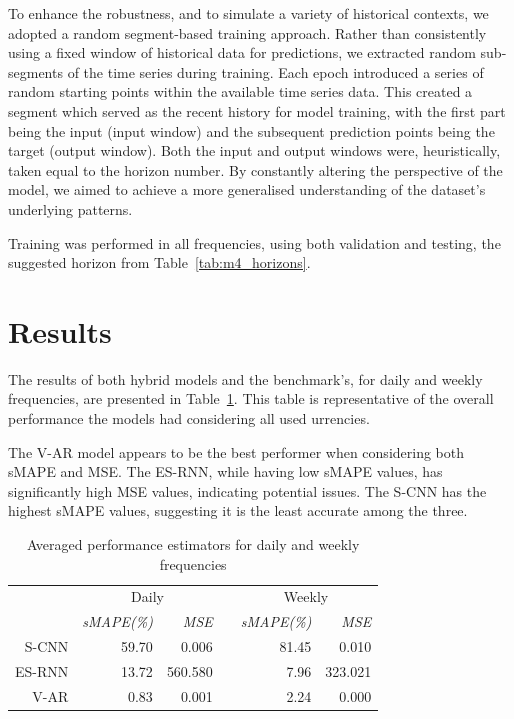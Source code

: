\documentclass[conference]{IEEEtran}
\begin{document}
To enhance the robustness, and to simulate a variety of historical contexts, we adopted a random segment-based training approach. Rather than consistently using a fixed window of historical data for predictions, we extracted random sub-segments of the time series during training. Each epoch introduced a series of random starting points within the available time series data. This created a segment which served as the recent history for model training, with the first part being the input (input window) and the subsequent prediction points being the target (output window). Both the input and output windows were, heuristically, taken equal to the horizon number. By constantly altering the perspective of the model, we aimed to achieve a more generalised understanding of the dataset's underlying patterns.

Training was performed in all frequencies, using both validation and testing, the suggested horizon from Table~\ref{tab:m4_horizons}.

\section{Results}

The results of both hybrid models and the benchmark's, for daily and weekly frequencies, are presented in Table~\ref{tab:res}. This table is representative of the overall performance the models had considering all used  urrencies.

The V-AR model appears to be the best performer when considering both sMAPE and MSE. The ES-RNN, while having low sMAPE values, has significantly high MSE values, indicating potential issues. The S-CNN has the highest sMAPE values, suggesting it is the least accurate among the three.

\begin{table}\centering
{}
\caption{Averaged performance estimators for daily and weekly frequencies}\label{tab:res}
\begin{tabular}{@{}rrrcrr@{}}\toprule
& \multicolumn{2}{c}{Daily} & \phantom{abc}& \multicolumn{2}{c}{Weekly}\\
\cmidrule{2-3} \cmidrule{4-6}
& \textit{sMAPE(\%)} & \textit{MSE} && \textit{sMAPE(\%)} & \textit{MSE} \\
\midrule
S-CNN & 59.70  & 0.006 && 81.45 & 0.010 \\
ES-RNN & 13.72 & 560.580 && 7.96 & 323.021\\
V-AR & 0.83 & 0.001 && 2.24 & 0.000\\
\bottomrule
\end{tabular}
\end{table}
\end{document}

